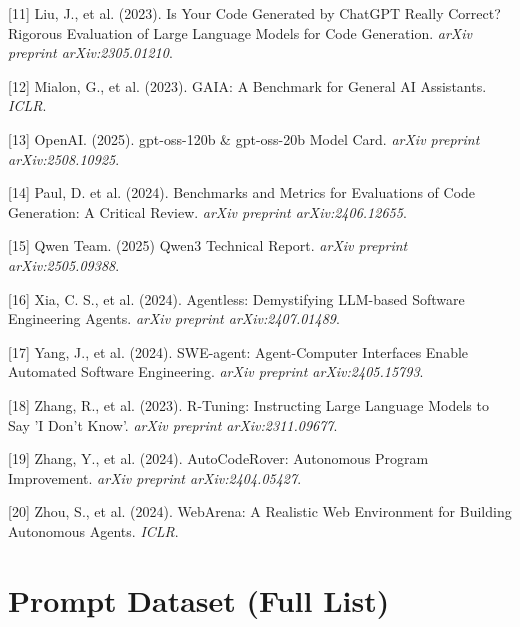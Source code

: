 \documentclass{article}
\begin{document}
[11] Liu, J., et al. (2023). Is Your Code Generated by ChatGPT Really Correct? Rigorous Evaluation of Large Language Models for Code Generation. \textit{arXiv preprint arXiv:2305.01210}.

[12] Mialon, G., et al. (2023). GAIA: A Benchmark for General AI Assistants. \textit{ICLR}.

[13] OpenAI. (2025). gpt-oss-120b \& gpt-oss-20b Model Card. \textit{arXiv preprint arXiv:2508.10925}.

[14] Paul, D. et al. (2024). Benchmarks and Metrics for Evaluations of Code Generation: A Critical Review. \textit{arXiv preprint arXiv:2406.12655}.

[15] Qwen Team. (2025) Qwen3 Technical Report. \textit{arXiv preprint arXiv:2505.09388}.

[16] Xia, C. S., et al. (2024). Agentless: Demystifying LLM-based Software Engineering Agents. \textit{arXiv preprint arXiv:2407.01489}.

[17] Yang, J., et al. (2024). SWE-agent: Agent-Computer Interfaces Enable Automated Software Engineering. \textit{arXiv preprint arXiv:2405.15793}.

[18] Zhang, R., et al. (2023). R-Tuning: Instructing Large Language Models to Say 'I Don't Know'. \textit{arXiv preprint arXiv:2311.09677}.

[19] Zhang, Y., et al. (2024). AutoCodeRover: Autonomous Program Improvement. \textit{arXiv preprint arXiv:2404.05427}.

[20] Zhou, S., et al. (2024). WebArena: A Realistic Web Environment for Building Autonomous Agents. \textit{ICLR}.


\appendix

\section{Prompt Dataset (Full List)}
\label{sec:prompt-dataset}
\end{document}
